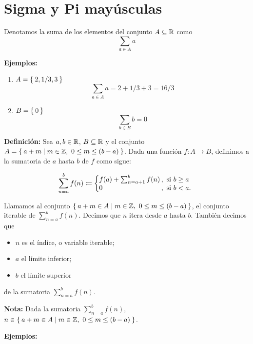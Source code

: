 \part*{Sigma y Pi mayúsculas}

Denotamos la suma de los elementos del conjunto $A\subseteq \mathbb{R}$ como \[\sum_{a\in A} a\]

\textbf{Ejemplos:}

\begin{enumerate}
  \item $A=\Set{2, 1/3, 3}$ \[\sum_{a\in A} a = 2 + 1/3 + 3 = 16/3\]
  \item $B=\Set{0}$ \[\sum_{b\in B} b = 0\]
\end{enumerate}

\textbf{Definición:} Sea $a,b\in \mathbb{R}$, $B\subseteq \mathbb{R}$ y el conjunto $A=\Set{a + m| m\in \mathbb{Z}, \ 0\leq m \leq (b-a)}$. Dada una función $f:A \to B$, definimos a la sumatoria de $a$ hasta $b$ de $f$ como sigue:

\vspace{-1.5em}\[
    \sum_{n=a}^{b} f(n) \defined \left\{
    \begin{array}{@{}l@{\thinspace}l}
    f(a) + \sum_{n=a+1}^{b} f(n) &,  \ \text{si}  \ b\geq a\\
    0 &,  \ \text{si}  \ b<a.
    \end{array} \right. \]\vspace{-1.5em}

    Llamamos al conjunto $\Set{a + m \in A | m\in \mathbb{Z}, \ 0\leq m \leq (b-a)}$, el conjunto iterable de $\sum_{n=a}^{b} f(n)$. Decimos que $n$ itera desde $a$ hasta $b$. También decimos que
\vspace{-1em}\begin{itemize}
  \item $n$ es el índice, o variable iterable;
  \item $a$ el límite inferior;
  \item $b$ el límite superior
\end{itemize}\vspace{-1em}
de la sumatoria $\sum_{n=a}^{b} f(n)$.

\textbf{Nota:} Dada la sumatoria $\sum_{n=a}^{b} f(n)$, $n\in \Set{a + m \in A | m\in \mathbb{Z}, \ 0\leq m \leq (b-a)}$.

\textbf{Ejemplos:}

